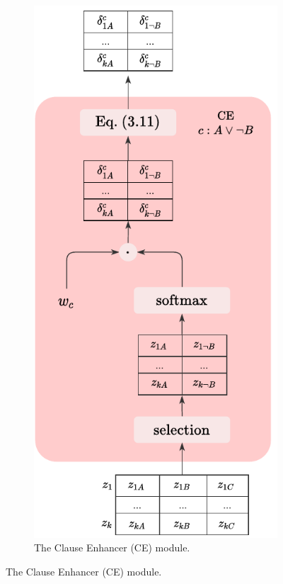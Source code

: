 \begin{figure}
	\centering
	\begin{subfigure}{.5\textwidth}
		\centering
		\includegraphics[width=0.9\linewidth]{figures/CE.pdf}
		\caption{The Clause Enhancer (CE) module.}
		\label{fig:ce}

\end{subfigure}
\end{figure}
